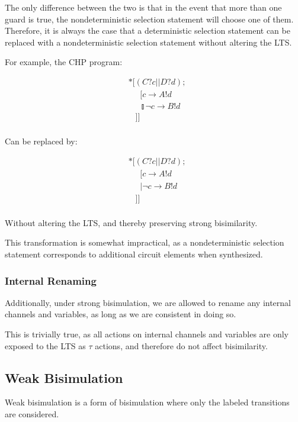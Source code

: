 \documentclass[times, 10pt]{article}
\begin{document}
The only difference between the two is that in the event that more than one
guard is true, the nondeterministic selection statement will choose one of them.
Therefore, it is always the case that a deterministic selection statement can be
replaced with a nondeterministic selection statement without altering the LTS.

For example, the CHP program:

\begin{align*}
&*[(C?c || D?d); \\
& \;\;\;\;\;[ c \rightarrow A!d \\
& \;\;\;\;\;\talloblong \lnot c \rightarrow B!d \\
& \;\;\;]] \\
\end{align*}

Can be replaced by:

\begin{align*}
&*[(C?c || D?d); \\
& \;\;\;\;\;[ c \rightarrow A!d \\
& \;\;\;\;\;| \lnot c \rightarrow B!d \\
& \;\;\;]] \\
\end{align*}

Without altering the LTS, and thereby preserving strong bisimilarity.

This transformation is somewhat impractical, as a nondeterministic selection
statement corresponds to additional circuit elements when synthesized.

\subsubsection{Internal Renaming}

Additionally, under strong bisimulation, we are allowed to rename any internal
channels and variables, as long as we are consistent in doing so.

This is trivially true, as all actions on internal channels and variables are
only exposed to the LTS as $\tau$ actions, and therefore do not affect
bisimilarity. 

\subsection{Weak Bisimulation}

Weak bisimulation is a form of bisimulation where only the labeled transitions
are considered.
\end{document}
